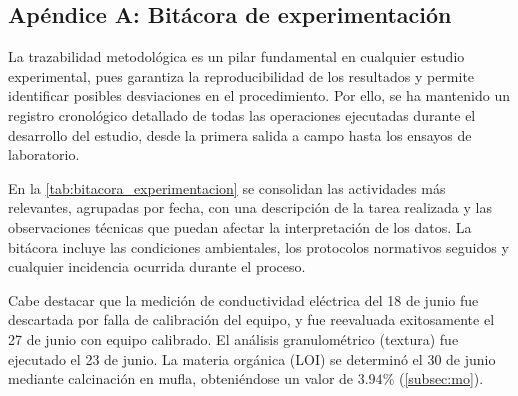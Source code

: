 \documentclass[fleqn]{jaes}
\begin{document}



\appendix

\subsection{Apéndice A: Bitácora de experimentación}
\label{sec:apendiceA}

La trazabilidad metodológica es un pilar fundamental en cualquier estudio experimental, pues garantiza la reproducibilidad de los resultados y permite identificar posibles desviaciones en el procedimiento. Por ello, se ha mantenido un registro cronológico detallado de todas las operaciones ejecutadas durante el desarrollo del estudio, desde la primera salida a campo hasta los ensayos de laboratorio.

En la \cref{tab:bitacora_experimentacion} se consolidan las actividades más relevantes, agrupadas por fecha, con una descripción de la tarea realizada y las observaciones técnicas que puedan afectar la interpretación de los datos. La bitácora incluye las condiciones ambientales, los protocolos normativos seguidos y cualquier incidencia ocurrida durante el proceso.

Cabe destacar que la medición de conductividad eléctrica del 18 de junio fue descartada por falla de calibración del equipo, y fue reevaluada exitosamente el 27 de junio con equipo calibrado. El análisis granulométrico (textura) fue ejecutado el 23 de junio. La materia orgánica (LOI) se determinó el 30 de junio mediante calcinación en mufla, obteniéndose un valor de $3.94\%$ (\cref{subsec:mo}).
\end{document}
